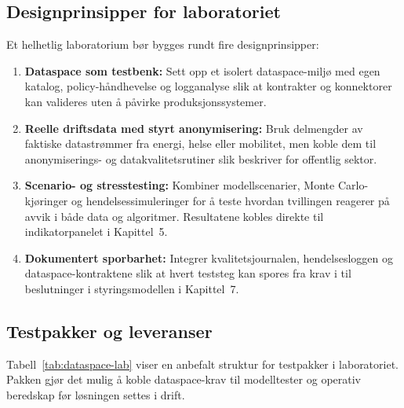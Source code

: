 \subsection{Designprinsipper for laboratoriet}
Et helhetlig laboratorium bør bygges rundt fire designprinsipper:
\begin{enumerate}
    \item \textbf{Dataspace som testbenk:} Sett opp et isolert dataspace-miljø med egen katalog, policy-håndhevelse og logganalyse slik at kontrakter og konnektorer kan valideres uten å påvirke produksjonssystemer.\citep{idsa2023operational}
    \item \textbf{Reelle driftsdata med styrt anonymisering:} Bruk delmengder av faktiske datastrømmer fra energi, helse eller mobilitet, men koble dem til anonymiserings- og datakvalitetsrutiner slik \citet{digdir2024sanntidsdata} beskriver for offentlig sektor.
    \item \textbf{Scenario- og stresstesting:} Kombiner modellscenarier, Monte Carlo-kjøringer og hendelsessimuleringer for å teste hvordan tvillingen reagerer på avvik i både data og algoritmer. Resultatene kobles direkte til indikatorpanelet i Kapittel~5.
    \item \textbf{Dokumentert sporbarhet:} Integrer kvalitetsjournalen, hendelsesloggen og dataspace-kontraktene slik at hvert teststeg kan spores fra krav i \citet{gaiax2023architecture} til beslutninger i styringsmodellen i Kapittel~7.
\end{enumerate}

\subsection{Testpakker og leveranser}
Tabell~\ref{tab:dataspace-lab} viser en anbefalt struktur for testpakker i laboratoriet. Pakken gjør det mulig å koble dataspace-krav til modelltester og operativ beredskap før løsningen settes i drift.

